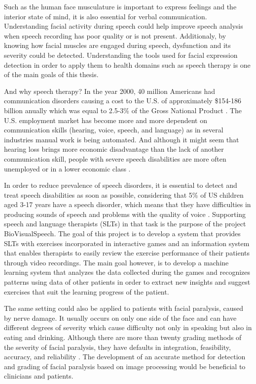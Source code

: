Such as the human face musculature is important to express feelings and the interior state of mind, it is also essential for verbal communication. Understanding facial activity during speech could help improve speech analysis when speech recording has poor quality or is not present. Additionaly, by knowing how facial muscles are engaged during speech, dysfunction and its severity could be detected. Understanding the tools used for facial expression detection in order to apply them to health domains such as speech therapy is one of the main goals of this thesis.

And why speech therapy? In the year 2000, 40 million Americans had communication disorders causing a cost to the U.S. of approximately \$154-186 billion anually which was equal to 2.5-3\% of the Gross National Product \cite{Ruben2000}. The U.S. employment market has become more and more dependent on communication skills (hearing, voice, speech, and language) as in several industries manual work is being automated. And although it might seem that hearing loss brings more economic disadvantage than the lack of another communication skill, people with severe speech disabilities are more often unemployed or in a lower economic class \cite{Ruben2000}.

In order to reduce prevalence of speech disorders, it is essential to detect and treat speech disabilities as soon as possible, considering that 5\% of US children aged 3-17 years have a  speech disorder, which means that they have difficulties in producing sounds of speech and problems with the quality of voice \cite{SpeechStatistics}. Supporting speech and language therapists (SLTs) in that task is the purpose of the project BioVisualSpeech. The goal of this project is to develop a system that provides SLTs with exercises incorporated in interactive games and an information system that enables therapists to easily review the exercise performance of their patients through video recordings. The main goal however, is to develop a machine learning system that analyzes the data collected during the games and recognizes patterns using data of other patients in order to extract new insights and suggest exercises that suit the learning progress of the patient.  

The same setting could also be applied to patients with facial paralysis, caused by nerve damage. It usually occurs on only one side of the face and can have different degrees of severity which cause difficulty not only in speaking but also in eating and drinking. Although there are more than twenty grading methods of the severity of facial paralysis, they have defaults in integration, feasibility, accuracy, and reliability \cite{Dong2008}. The development of an accurate method for detection and grading of facial paralysis based on image processing would be beneficial to clinicians and patients.


